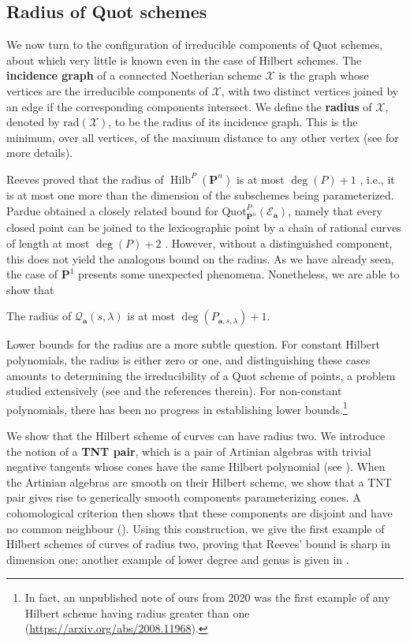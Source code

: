 \documentclass[leqno,11pt,a4paper]{amsart}
\newenvironment{customthm}[1]
  {\renewcommand\theinnercustomthm{#1}\innercustomthm}
  {\endinnercustomthm}
\theoremstyle{definition}
\numberwithin{equation}{section}
\newcommand{\bfa}{\mathbf{a}}
\newcommand{\Quot}{\mathrm{Quot}}
\newcommand{\PP}{\mathbf{P}}
\newcommand{\EE}{\mathscr{E}}
\newcommand{\QQ}{\mathcal{Q}}
\newcommand{\XX}{\mathcal{X}}
\DeclareMathOperator{\Hilb}{Hilb}
\begin{document}
\subsection{Radius of Quot schemes}
We now turn to the configuration of irreducible components of Quot schemes, about which very little is known even in the case of Hilbert schemes.
The \textbf{incidence graph} of a connected Noetherian scheme $\XX$ is the graph whose vertices are the irreducible components of $\XX$, with two distinct vertices joined by an edge if the
corresponding components intersect. 
We define the \textbf{radius} of $\XX$, denoted by $\mathrm{rad}(\XX)$, to be the radius of its incidence graph. This is the minimum, over all vertices, of the maximum distance to any other vertex (see  for more details).

Reeves proved that the radius of $\Hilb^P(\PP^n)$ is at most $\deg(P)+1$ \cite{Reeves_radius}, i.e., it is at most one more than the dimension of the subschemes being parameterized. 
Pardue obtained a closely related bound for $\Quot_{\PP^n}^{P}(\EE_\bfa)$, namely that every closed point can be joined to the lexicographic point by a chain of rational curves of
length at most $\deg(P)+2$ \cite{Pardue}. 
However, without a distinguished component, this does not yield the analogous bound on the radius. 
As we have already seen, the case of $\PP^1$ presents some unexpected phenomena. 
Nonetheless, we are able to show that

\begin{customthm}{F} 
The radius of $\QQ_{\bfa}(s,\lambda)$ is at most $\deg(P_{\bfa,s,\lambda})+1$.
\end{customthm}

Lower bounds for the radius are a more subtle question. 
For constant Hilbert polynomials, the radius is either zero or one, and distinguishing
these cases amounts to determining the irreducibility of a Quot scheme of points, a problem studied extensively (see \cite{iarrobino_reducibility, cartwright_erman_velasco_viray_Hilb8,DJNT,jelisiejew_sivic} and the references therein).
For non-constant polynomials, there has been no progress in establishing lower bounds.\footnote{In fact, an unpublished note of ours from 2020 was the first example of any Hilbert scheme having radius greater than one (\url{https://arxiv.org/abs/2008.11968}).}

We show that the Hilbert scheme of curves can have radius two.
We introduce the notion of a \textbf{TNT pair}, which is a pair of Artinian algebras with trivial negative tangents whose cones have the same Hilbert polynomial (see ).
When the Artinian algebras are smooth on their Hilbert scheme, we show that a TNT pair gives rise to generically smooth components parameterizing cones.
A cohomological criterion then shows that these components are disjoint and have no common neighbour (). 
Using this construction, we give the first example of Hilbert schemes of curves of radius two, proving that Reeves' bound is sharp in dimension one; another example of lower degree and genus is given in .
\end{document}
